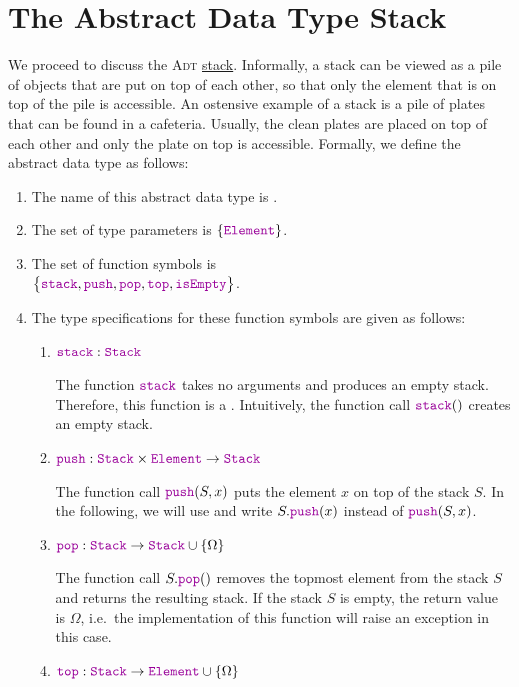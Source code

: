 \section{The Abstract Data Type Stack}
We proceed to discuss the \textsc{Adt} \href{https://en.wikipedia.org/wiki/Stack_(abstract_data_type)}{stack}.
Informally, a stack can be viewed as a pile of objects that are put on top of each other, so that
only the element that is on top of the pile is accessible.  An ostensive example of a stack is a pile of
plates that can be found in a cafeteria.  Usually, the clean plates are placed on top of each other
and only the plate on top is accessible.  Formally, we define the abstract data type
 as follows: 
\begin{enumerate}
\item The name of this abstract data type is .
\item The set of type parameters is $\{ \mytt{Element} \}$.
\item The set of function symbols is \\[0.2cm]
      \hspace*{1.3cm} 
      $\bigl\{ \mytt{stack}, \mytt{push}, \mytt{pop}, \mytt{top}, \mytt{isEmpty} \bigr\}$.
\item The type specifications for these function symbols are given as follows:
      \begin{enumerate}
      \item $\mytt{stack}: \mytt{Stack}$

            The function $\mytt{stack}$ takes no arguments and produces an empty stack.
            Therefore, this function is a .  Intuitively, the function call $\mytt{stack}()$ 
            creates an empty stack.
      \item $\mytt{push}: \mytt{Stack} \times \mytt{Element} \rightarrow \mytt{Stack}$

            The function call $\mytt{push}(S,x)$ puts the element $x$ on top of the stack $S$.  In
            the following, we will use 
            and write $S.\mytt{push}(x)$ instead of $\mytt{push}(S,x)$.
      \item $\mytt{pop}: \mytt{Stack}  \rightarrow \mytt{Stack} \cup \{ \Omega \}$

            The function call $S.\mytt{pop}()$ removes the topmost element from the stack $S$ and returns the
            resulting stack.  If the stack $S$ is empty, the return value is $\Omega$, i.e.~the implementation
            of this function will raise an exception in this case.
      \item $\mytt{top}: \mytt{Stack} \rightarrow \mytt{Element} \cup \{ \Omega \}$


\end{enumerate}
\end{enumerate}
